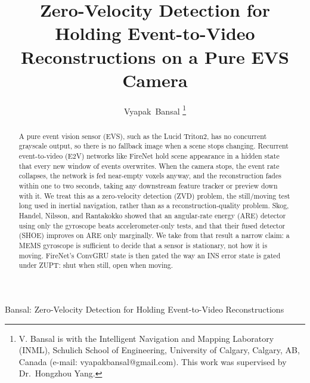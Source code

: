 \documentclass[journal]{IEEEtran}
\begin{document}
\title{Zero-Velocity Detection for Holding Event-to-Video
Reconstructions on a Pure EVS Camera}

\author{Vyapak~Bansal%
\thanks{V. Bansal is with the Intelligent Navigation and Mapping Laboratory
(INML), Schulich School of Engineering, University of Calgary, Calgary, AB,
Canada (e-mail: vyapakbansal@gmail.com). This work was supervised by
Dr.~Hongzhou Yang.}}

%
{Bansal: Zero-Velocity Detection for Holding Event-to-Video Reconstructions}

\maketitle

\begin{abstract}
A pure event vision sensor (EVS), such as the Lucid Triton2, has no concurrent
grayscale output, so there is no fallback image when a scene stops changing.
Recurrent event-to-video (E2V) networks like FireNet hold scene appearance in a
hidden state that every new window of events overwrites. When the camera stops,
the event rate collapses, the network is fed near-empty voxels anyway, and the
reconstruction fades within one to two seconds, taking any downstream feature
tracker or preview down with it. We treat this as a zero-velocity detection
(ZVD) problem, the still/moving test long used in inertial navigation, rather
than as a reconstruction-quality problem. Skog, Handel, Nilsson, and Rantakokko
showed that an angular-rate energy (ARE) detector using only the gyroscope beats
accelerometer-only tests, and that their fused detector (SHOE) improves on ARE
only marginally. We take from that result a narrow claim: a MEMS gyroscope is
sufficient to decide that a sensor is stationary, not how it is moving.
FireNet's ConvGRU state is then gated the way an INS error state is gated under
ZUPT: shut when still, open when moving.


\end{abstract}
\end{document}
